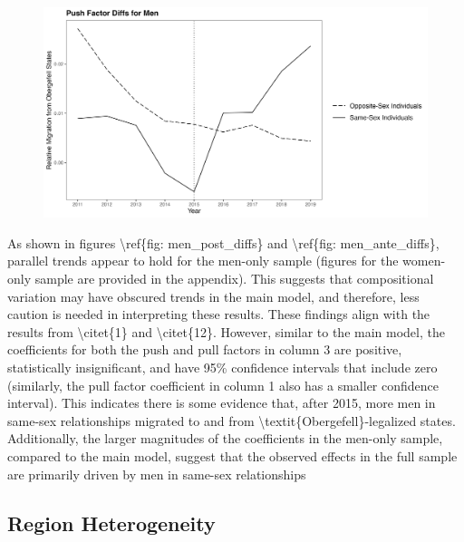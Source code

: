 \documentclass[12pt,letterpaper]{article}
\begin{document}
\begin{figure}[htbp]
    \centering
    \includegraphics[width=1\linewidth]{outputs/summary_stats/men_ante_diffs.png}
    \caption{}
    \label{fig: men_ante_diffs}
\end{figure}

As shown in figures \textbackslash{}ref\{fig: men\_post\_diffs\} and \textbackslash{}ref\{fig: men\_ante\_diffs\}, parallel trends appear to hold for the men-only sample (figures for the women-only sample are provided in the appendix). This suggests that compositional variation may have obscured trends in the main model, and therefore, less caution is needed in interpreting these results. These findings align with the results from \textbackslash{}citet\{1\} and \textbackslash{}citet\{12\}. However, similar to the main model, the coefficients for both the push and pull factors in column 3 are positive, statistically insignificant, and have 95\% confidence intervals that include zero (similarly, the pull factor coefficient in column 1 also has a smaller confidence interval). This indicates there is some evidence that, after 2015, more men in same-sex relationships migrated to and from \textbackslash{}textit\{Obergefell\}-legalized states. Additionally, the larger magnitudes of the coefficients in the men-only sample, compared to the main model, suggest that the observed effects in the full sample are primarily driven by men in same-sex relationships

\FloatBarrier
\subsection{Region Heterogeneity}
\end{document}
